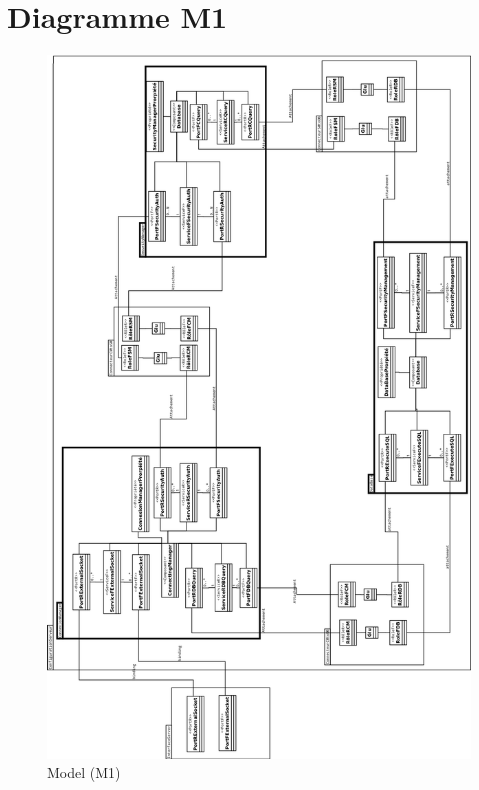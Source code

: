 \section{Diagramme M1}
\pagestyle{empty}
\begin{figure}[htb]
  \centering
  \includegraphics[scale=0.20]{img/M1}
  \caption{Model (M1)}
  \label{fig:M1}
\end{figure}
